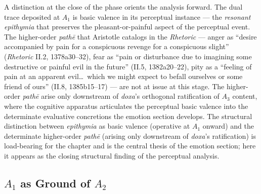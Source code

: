 \documentclass{article}
\begin{document}
A distinction at the close of the phase orients the analysis forward. The dual trace deposited at $A_1$ is basic valence in its perceptual instance --- the \textit{resonant epithymia} that preserves the pleasant-or-painful aspect of the perceptual event. The higher-order \textit{pathē} that Aristotle catalogs in the \textit{Rhetoric} --- anger as ``desire accompanied by pain for a conspicuous revenge for a conspicuous slight'' (\textit{Rhetoric} II.2, 1378a30--32), fear as ``pain or disturbance due to imagining some destructive or painful evil in the future'' (II.5, 1382a20--22), pity as a ``feeling of pain at an apparent evil\ldots\ which we might expect to befall ourselves or some friend of ours'' (II.8, 1385b15--17) --- are not at issue at this stage. The higher-order \textit{pathē} arise only downstream of \textit{doxa}'s orthogonal ratification of $A_3$ content, where the cognitive apparatus articulates the perceptual basic valence into the determinate evaluative concretions the emotion section develops. The structural distinction between \textit{epithymia} as basic valence (operative at $A_1$ onward) and the determinate higher-order \textit{pathē} (arising only downstream of \textit{doxa}'s ratification) is load-bearing for the chapter and is the central thesis of the emotion section; here it appears as the closing structural finding of the perceptual analysis.

\subsection{$A_1$ as Ground of $A_2$}
\end{document}
